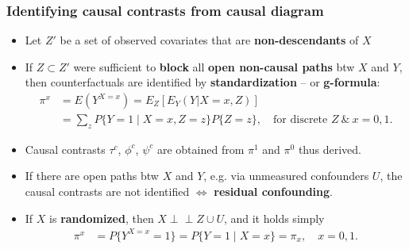 \documentclass[12pt,dvipsnames,t,aspectratio=169, handout%
]{beamer}
\newcommand{\indep}{\perp\!\!\!\perp}
\begin{document}
\begin{frame}
\frametitle{\large Identifying causal contrasts from causal diagram}

\begin{itemize}
\item
Let $Z'$ be a set of observed covariates that are {\bf non-descendants} of $X$
\medskip
\item
If $Z\subset Z'$ were sufficient to {\bf block} all \textbf{open non-causal paths}
 btw $X$ and $Y$, then
counterfactuals are identified by {\bf standardization} -- or {\bf g-formula}:
\begin{align*}
 \pi^x & = E( Y^{X=x}) = E_Z[E_Y(Y|X=x, Z)] \\
   & = \sum_z P \{ Y=1 \mid X= x, Z=z \} P\{ Z=z\} , \quad\text{for discrete }Z\ \& \ x=0,1.
\end{align*}
\pause
\item
Causal contrasts $\tau^c$, $\phi^c$, $\psi^c$	are obtained from  $\pi^1$
and $\pi^0$ thus derived.
\pause
\medskip
\item 
If there are {open paths} btw $X$ and $Y$, e.g. via unmeasured 
confounders $U$, the causal
contrasts are not identified $\Leftrightarrow$ {\bf residual confounding}.
\pause
\medskip
\item
If $X$ is \textbf{randomized}, then  %
$X\indep Z\cup U$, 
and it holds simply %
\begin{align*}
\pi^x & = P \{ Y^{X=x} = 1 \} =  P \{ Y=1 \mid X= x \} = \pi_x, \quad x=0,1. 
\end{align*}
\end{itemize}	
\end{frame}
\end{document}
